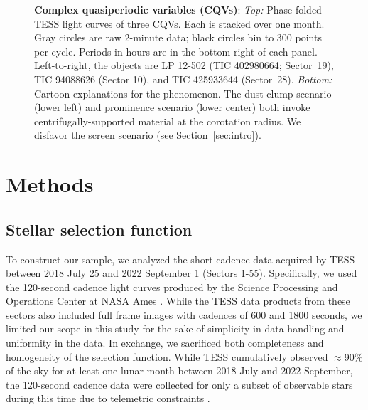 \documentclass[11pt,twocolumn,tighten]{aastex63}
\begin{document}
\begin{figure*}[!t]
	\begin{center}
		
		\vspace{-0.6cm}
	\end{center}
		\vspace{-0.3cm}
	\caption{
		{\bf Complex quasiperiodic variables (CQVs)}:
    {\it Top:} Phase-folded TESS light curves of three CQVs.  Each is
    stacked over one month.  Gray circles are raw 2-minute data; black
    circles bin to 300 points per cycle.  Periods in hours are in the
    bottom right of each panel.  Left-to-right, the objects are LP
    12-502 (TIC 402980664; Sector~19), TIC 94088626 (Sector 10), and
    TIC 425933644 (Sector~28).
    {\it Bottom:} Cartoon explanations for the phenomenon.  The dust clump
    scenario (lower left) and prominence scenario (lower center) both
    invoke centrifugally-supported material at the corotation radius.
    We disfavor the screen scenario (see Section~\ref{sec:intro}).
	}
	\label{fig:f1}
\end{figure*}



\section{Methods}
\label{sec:methods}

\subsection{Stellar selection function}
\label{subsec:selectionfn}

To construct our sample, we analyzed the short-cadence data acquired
by TESS between 2018 July 25 and 2022 September 1 (Sectors 1-55).
Specifically, we used the 120-second cadence light curves produced by
the Science Processing and Operations Center at NASA Ames
\citep{2016SPIE.9913E..3EJ}.  While the TESS data products from these
sectors also included full frame images with cadences of 600 and 1800
seconds, we limited our scope in this study for the sake of simplicity
in data handling and uniformity in the data.  In exchange, we
sacrificed both completeness and homogeneity of the selection
function.  While TESS cumulatively observed $\approx$90\% of the sky
for at least one lunar month between 2018 July and 2022 September, the
120-second cadence data were collected for only a subset of observable
stars during this time due to telemetric constraints
\citep[see][]{2021PASP..133i5002F}.
\end{document}
